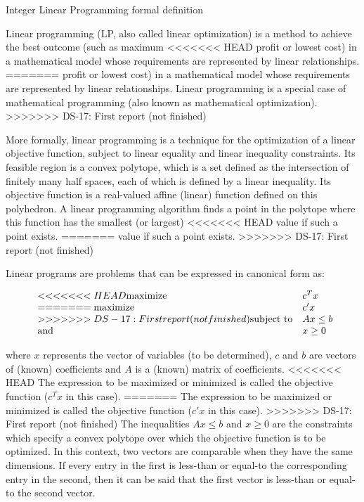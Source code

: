 \documentclass[9pt]{extarticle}
\begin{document}
    \begin{section}{Integer Linear Programming formal definition}

        Linear programming (LP, also called linear optimization) is a method to achieve the best outcome (such as maximum 
<<<<<<< HEAD
        profit or lowest cost) in a mathematical model whose requirements are represented by linear relationships.
=======
        profit or lowest cost) in a mathematical model whose requirements are represented by linear relationships. 
        Linear programming is a special case of mathematical programming (also known as mathematical optimization).
>>>>>>> DS-17: First report (not finished)
        \cite{wiki:lp}

        More formally, linear programming is a technique for the optimization of a linear objective function, subject to 
        linear equality and linear inequality constraints. 
        Its feasible region is a convex polytope, which is a set defined as the intersection of finitely many half spaces, 
        each of which is defined by a linear inequality. 
        Its objective function is a real-valued affine (linear) function defined on this polyhedron. 
        A linear programming algorithm finds a point in the polytope where this function has the smallest (or largest) 
<<<<<<< HEAD
        value if such a point exists. \cite{wiki:lp}
        \newpage
=======
        value if such a point exists.
        \cite{wiki:lp}
>>>>>>> DS-17: First report (not finished)

        Linear programs are problems that can be expressed in canonical form as:
        
        \begin{equation*}
            \begin{array}{ll@{}ll}
<<<<<<< HEAD
                \text{maximize}  & c^{T}x \\
=======
                \text{maximize}  & c'x \\
>>>>>>> DS-17: First report (not finished)
                \text{subject to} & Ax \leq b \\
                \text{and} & x \ge 0
            \end{array}
        \end{equation*}

        where $x$ represents the vector of variables (to be determined), $c$ and $b$ are vectors of (known) coefficients and 
        $A$ is a (known) matrix of coefficients.
<<<<<<< HEAD
        The expression to be maximized or minimized is called the objective function ($c^{T}x$ in this case). 
=======
        The expression to be maximized or minimized is called the objective function ($c'x$ in this case). 
>>>>>>> DS-17: First report (not finished)
        The inequalities $Ax \leq b$ and $x \ge 0$ are the constraints which specify a convex polytope over which the objective 
        function is to be optimized. 
        In this context, two vectors are comparable when they have the same dimensions. 
        If every entry in the first is less-than or equal-to the corresponding entry in the second, then it can be said 
        that the first vector is less-than or equal-to the second vector.
        \cite{wiki:lp}


\end{section}
\end{document}
